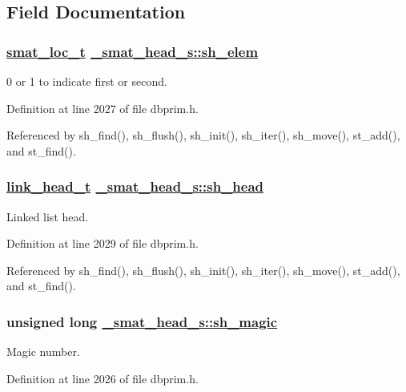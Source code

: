 \subsection{Field Documentation}
\hypertarget{struct__smat__head__s_o1}{
\subsubsection[sh\_\-elem]{\setlength{\rightskip}{0pt plus 5cm}\hyperlink{group__dbprim__smat_ga6}{smat\_\-loc\_\-t} \hyperlink{struct__smat__head__s_o1}{\_\-smat\_\-head\_\-s::sh\_\-elem}}}
\label{struct__smat__head__s_o1}


0 or 1 to indicate first or second. 

Definition at line 2027 of file dbprim.h.

Referenced by sh\_\-find(), sh\_\-flush(), sh\_\-init(), sh\_\-iter(), sh\_\-move(), st\_\-add(), and st\_\-find().\hypertarget{struct__smat__head__s_o3}{
\subsubsection[sh\_\-head]{\setlength{\rightskip}{0pt plus 5cm}\hyperlink{struct__link__head__s}{link\_\-head\_\-t} \hyperlink{struct__smat__head__s_o3}{\_\-smat\_\-head\_\-s::sh\_\-head}}}
\label{struct__smat__head__s_o3}


Linked list head. 

Definition at line 2029 of file dbprim.h.

Referenced by sh\_\-find(), sh\_\-flush(), sh\_\-init(), sh\_\-iter(), sh\_\-move(), st\_\-add(), and st\_\-find().\hypertarget{struct__smat__head__s_o0}{
\subsubsection[sh\_\-magic]{\setlength{\rightskip}{0pt plus 5cm}unsigned long \hyperlink{struct__smat__head__s_o0}{\_\-smat\_\-head\_\-s::sh\_\-magic}}}
\label{struct__smat__head__s_o0}


Magic number. 

Definition at line 2026 of file dbprim.h.

